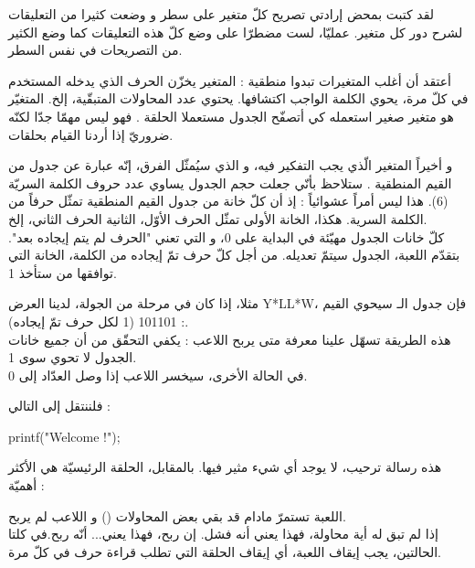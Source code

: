 لقد كتبت بمحض إرادتي تصريح كلّ متغير على سطر و وضعت كثيرا من التعليقات لشرح دور كل متغير. عمليّا، لست مضطرّا على وضع كلّ هذه التعليقات كما وضع الكثير من التصريحات في نفس السطر.

أعتقد أن أغلب المتغيرات تبدوا منطقية : المتغير
يخزّن الحرف الذي يدخله المستخدم في كلّ مرة،
يحوي الكلمة الواجب اكتشافها.
يحتوي عدد المحاولات المتبقّية، إلخ. المتغيّر
هو متغير صغير استعمله كي أتصفّح الجدول مستعملا الحلقة
.
فهو ليس مهمّا جدّا لكنّه ضروريّ إذا أردنا القيام بحلقات.

و أخيراً المتغير الّذي يجب التفكير فيه، و الذي سيُمثّل الفرق، إنّه عبارة عن جدول من القيم المنطقية
.
ستلاحظ بأنّي جعلت حجم الجدول يساوي عدد حروف الكلمة السريّة (6). هذا ليس أمراً عشوائياً : إذ أن كلّ خانة من جدول القيم المنطقية  تمثّل حرفاً من الكلمة السرية. هكذا، الخانة الأولى تمثّل الحرف الأوّل، الثانية الحرف الثاني، إلخ.\\
كلّ خانات الجدول مهيّئة في البداية على 0، و التي تعني "الحرف لم يتم إيجاده بعد". بتقدّم اللعبة، الجدول سيتمّ تعديله. من أجل كلّ حرف تمّ إيجاده من الكلمة، الخانة التي توافقها من
ستأخذ 1.

مثلا، إذا كان في مرحلة من الجولة، لدينا العرض
\textenglish{Y*LL*W}،
فإن جدول الـ
سيحوي القيم : 101101 (1 لكل حرف تمّ إيجاده).\\
هذه الطريقة تسهّل علينا معرفة متى يربح اللاعب : يكفي التحقّق من أن جميع خانات الجدول لا تحوي سوى 1.\\
في الحالة الأخرى، سيخسر اللاعب إذا وصل العدّاد
إلى 0.

فلننتقل إلى التالي :

\begin{Csource}
printf("Welcome !\n\n");
\end{Csource}

هذه رسالة ترحيب، لا يوجد أي شيء مثير فيها. بالمقابل، الحلقة الرئيسيّة هي  الأكثر أهميّة :

\begin{Csource}
while (remainingTries  > 0 && !win(foundLetter))
{
\end{Csource}

اللعبة تستمرّ مادام قد بقي بعض المحاولات
()
و اللاعب لم يربح.\\
إذا لم تبق له أية محاولة، فهذا يعني أنه فشل. إن ربح، فهذا يعني... أنّه ربح.في كلتا الحالتين، يجب إيقاف اللعبة، أي إيقاف الحلقة التي تطلب قراءة حرف في كلّ مرة.

